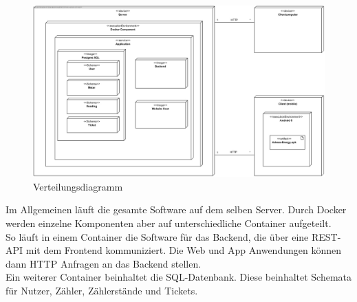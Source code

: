 \begin{figure}[H]
	\centering
	\includegraphics[width=16cm]{img/diagrams/DeploymentDiagram}
		\caption{Verteilungsdiagramm}
\end{figure}
Im Allgemeinen läuft die gesamte Software auf dem selben Server. Durch Docker werden einzelne Komponenten aber auf unterschiedliche Container aufgeteilt.\\
So läuft in einem Container die Software für das Backend, die über eine REST-API mit dem Frontend kommuniziert. Die Web und App Anwendungen können dann HTTP Anfragen an das Backend stellen.\\
Ein weiterer Container beinhaltet die SQL-Datenbank. Diese beinhaltet Schemata für Nutzer, Zähler, Zählerstände und Tickets.
